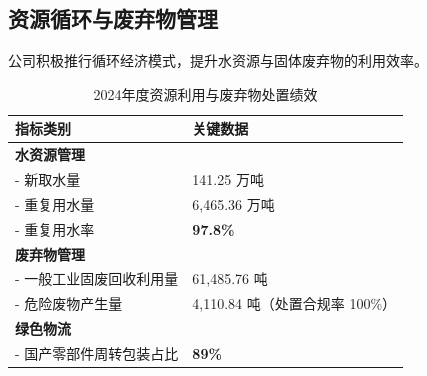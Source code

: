 \documentclass[a4paper,12pt]{article}
\begin{document}
\subsection{资源循环与废弃物管理}
公司积极推行循环经济模式，提升水资源与固体废弃物的利用效率。

\begin{table}[h]
\centering
\caption{2024年度资源利用与废弃物处置绩效}
\begin{tabular}{l l}
\toprule
\textbf{指标类别} & \textbf{关键数据} \\
\midrule
\textbf{水资源管理} & \\
- 新取水量 & 141.25 万吨 \\
- 重复用水量 & 6,465.36 万吨 \\
- 重复用水率 & \textbf{97.8\%} \\
\midrule
\textbf{废弃物管理} & \\
- 一般工业固废回收利用量 & 61,485.76 吨 \\
- 危险废物产生量 & 4,110.84 吨（处置合规率 100\%） \\
\midrule
\textbf{绿色物流} & \\
- 国产零部件周转包装占比 & \textbf{89\%} \\
\bottomrule
\end{tabular}
\end{table}
\end{document}
